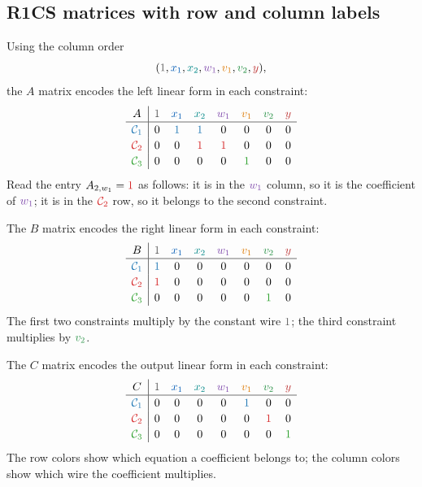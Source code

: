 \documentclass[11pt]{article}
\newcommand{\constwire}[1]{\textcolor{wireconstcolor}{#1}}
\newcommand{\xone}[1]{\textcolor{wirexonecolor}{#1}}
\newcommand{\xtwo}[1]{\textcolor{wirextwocolor}{#1}}
\newcommand{\wone}[1]{\textcolor{wirewonecolor}{#1}}
\newcommand{\vone}[1]{\textcolor{wirevonecolor}{#1}}
\newcommand{\vtwo}[1]{\textcolor{wirevtwocolor}{#1}}
\newcommand{\ywire}[1]{\textcolor{wireycolor}{#1}}
\newcommand{\rowone}[1]{\textcolor{rowonecolor}{#1}}
\newcommand{\rowtwo}[1]{\textcolor{rowtwocolor}{#1}}
\newcommand{\rowthree}[1]{\textcolor{rowthreecolor}{#1}}
\begin{document}
\subsection{R1CS matrices with row and column labels}

Using the column order
\[
    (\constwire{1},\xone{x_1},\xtwo{x_2},\wone{w_1},\vone{v_1},\vtwo{v_2},\ywire{y}),
\]
the $A$ matrix encodes the left linear form in each constraint:
\[
\renewcommand{\arraystretch}{1.15}
\begin{array}{c|ccccccc}
A & \constwire{1} & \xone{x_1} & \xtwo{x_2} & \wone{w_1} & \vone{v_1} & \vtwo{v_2} & \ywire{y} \\
\hline
\rowone{\mathcal C_1} & 0 & \rowone{1} & \rowone{1} & 0 & 0 & 0 & 0 \\
\rowtwo{\mathcal C_2} & 0 & 0 & \rowtwo{1} & \rowtwo{1} & 0 & 0 & 0 \\
\rowthree{\mathcal C_3} & 0 & 0 & 0 & 0 & \rowthree{1} & 0 & 0
\end{array}
\]
Read the entry $A_{2,w_1}=\rowtwo{1}$ as follows: it is in the $\wone{w_1}$ column, so it is the coefficient of $\wone{w_1}$; it is in the $\rowtwo{\mathcal C_2}$ row, so it belongs to the second constraint.

The $B$ matrix encodes the right linear form in each constraint:
\[
\renewcommand{\arraystretch}{1.15}
\begin{array}{c|ccccccc}
B & \constwire{1} & \xone{x_1} & \xtwo{x_2} & \wone{w_1} & \vone{v_1} & \vtwo{v_2} & \ywire{y} \\
\hline
\rowone{\mathcal C_1} & \rowone{1} & 0 & 0 & 0 & 0 & 0 & 0 \\
\rowtwo{\mathcal C_2} & \rowtwo{1} & 0 & 0 & 0 & 0 & 0 & 0 \\
\rowthree{\mathcal C_3} & 0 & 0 & 0 & 0 & 0 & \rowthree{1} & 0
\end{array}
\]
The first two constraints multiply by the constant wire $\constwire{1}$; the third constraint multiplies by $\vtwo{v_2}$.

The $C$ matrix encodes the output linear form in each constraint:
\[
\renewcommand{\arraystretch}{1.15}
\begin{array}{c|ccccccc}
C & \constwire{1} & \xone{x_1} & \xtwo{x_2} & \wone{w_1} & \vone{v_1} & \vtwo{v_2} & \ywire{y} \\
\hline
\rowone{\mathcal C_1} & 0 & 0 & 0 & 0 & \rowone{1} & 0 & 0 \\
\rowtwo{\mathcal C_2} & 0 & 0 & 0 & 0 & 0 & \rowtwo{1} & 0 \\
\rowthree{\mathcal C_3} & 0 & 0 & 0 & 0 & 0 & 0 & \rowthree{1}
\end{array}
\]
The row colors show which equation a coefficient belongs to; the column colors show which wire the coefficient multiplies.
\end{document}
